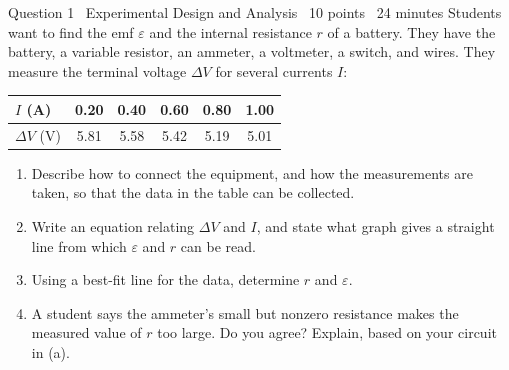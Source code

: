 \documentclass[11pt]{article}
\begin{document}
\begin{frq}{Question 1 \textperiodcentered\ Experimental Design and Analysis \textperiodcentered\ 10 points \textperiodcentered\ 24 minutes}
Students want to find the emf $\varepsilon$ and the internal resistance $r$ of a battery. They have the battery, a variable resistor, an ammeter, a voltmeter, a switch, and wires. They measure the terminal voltage $\Delta V$ for several currents $I$:

\medskip
\begin{tabular}{@{}lccccc@{}}\toprule
$I$ (A) & 0.20 & 0.40 & 0.60 & 0.80 & 1.00 \\ \midrule
$\Delta V$ (V) & 5.81 & 5.58 & 5.42 & 5.19 & 5.01 \\ \bottomrule
\end{tabular}

\begin{enumerate}[label=(\alph*),leftmargin=2em,itemsep=4pt]
\item Describe how to connect the equipment, and how the measurements are taken, so that the data in the table can be collected. 
\item Write an equation relating $\Delta V$ and $I$, and state what graph gives a straight line from which $\varepsilon$ and $r$ can be read. 
\item Using a best-fit line for the data, determine $r$ and $\varepsilon$. 
\item A student says the ammeter's small but nonzero resistance makes the measured value of $r$ too large. Do you agree? Explain, based on your circuit in (a). 
\end{enumerate}
\end{frq}

\makekey
\end{document}
